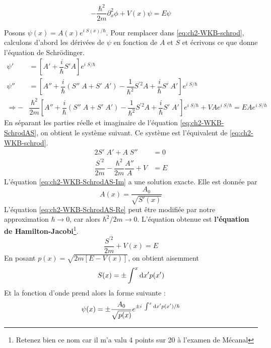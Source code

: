 \documentclass[12pt, a4paper]{book}
\begin{document}
\begin{equation}\label{eq:ch2-WKB-schrod}
  -\dfrac{\hbar^2}{2m} \partial_x ^2 \phi + V(x)\psi = E\psi
\end{equation}

Posons $\psi(x) = A(x) e^{i\; S(x)/\hbar}$. Pour remplacer dans \ref{eq:ch2-WKB-schrod}, calculons d'abord les dérivées de $\psi$ en fonction de $A$ et $S$ et écrivons ce que donne l'équation de Schrödinger.
\begin{align}
  \psi' &= \left[ A' + \dfrac{i}{\hbar} S' A\right]e^{i\; S/\hbar} \\
  \psi'' &= \left[A'' + \dfrac{i}{\hbar} (S''\; A + S'\; A') - \dfrac{1}{\hbar ^2} S^{\prime 2} A + \dfrac{i}{\hbar} S' \; A'\right] e ^{i\; S/\hbar} \\
  \Rightarrow -&\dfrac{\hbar ^2 }{2m} \left[A'' + \dfrac{i}{\hbar} (S''\; A + S'\; A') - \dfrac{1}{\hbar ^2} S^{\prime 2} A + \dfrac{i}{\hbar} S' \; A'\right] e ^{i\; S/\hbar} + VA e ^{i\; S/\hbar} = EA e ^{i\; S/\hbar} \label{eq:ch2-WKB-SchrodAS}
\end{align}
En séparant les parties réelle et imaginaire de l'équation \ref{eq:ch2-WKB-SchrodAS}, on obtient le système suivant. Ce système est l'équivalent de \ref{eq:ch2-WKB-schrod}.
\begin{align}
      2S' \; A' + A \; S'' &= 0 \label{eq:ch2-WKB-SchrodAS-Im} \\
      \dfrac{S^{\prime 2}}{2m} - \dfrac{\hbar ^2}{2m} \dfrac{A''}{A} + V &= E \label{eq:ch2-WKB-SchrodAS-Re} 
\end{align}
L'équation \ref{eq:ch2-WKB-SchrodAS-Im} a une solution exacte. Elle est donnée par 
\begin{equation}
  A(x) = \dfrac{A_0}{\sqrt{S'(x)}}
\end{equation}
L'équation \ref{eq:ch2-WKB-SchrodAS-Re} peut être modifiée par notre approximation $\hbar \longrightarrow 0$, car alors $\hbar ^2/2m \longrightarrow 0$. L'équation obtenue est \textbf{l'équation de Hamilton-Jacobi}\footnote{Retenez bien ce nom car il m'a valu 4 points sur 20 à l'examen de Mécanal}.
\begin{equation}
  \dfrac{S^{\prime 2}}{2m} + V(x) = E
\end{equation}
En posant $p(x) = \sqrt{2m[E - V(x)]}$, on obtient aisemment
\begin{equation}
  S(x) = \pm \int ^x \mathrm{d} x' p(x')
\end{equation}
Et la fonction d'onde prend alors la forme suivante :
\begin{equation}
  \psi(x) = \pm \dfrac{A_0}{\sqrt{p(x)}} e^{\pm i \; \int ^x \mathrm{d} x' p(x')/\hbar}
\end{equation}
\end{document}
